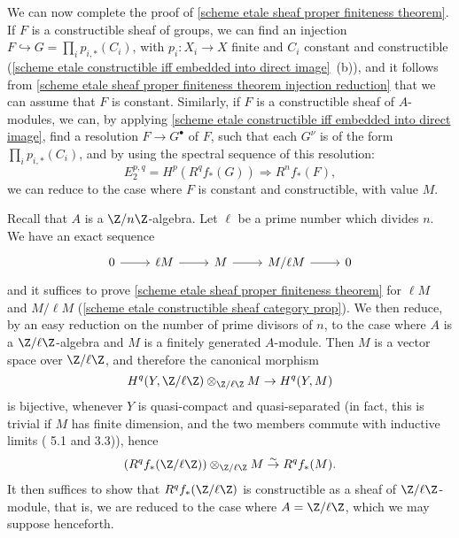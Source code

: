 We can now complete the proof of \cref{scheme etale sheaf proper finiteness theorem}. If $F$ is a constructible sheaf of groups, we can find an injection $F\hookrightarrow G=\prod_ip_{i,*}(C_i)$, with $p_i:X_i\to X$ finite and $C_i$ constant and constructible (\cref{scheme etale constructible iff embedded into direct image}~(b)), and it follows from \cref{scheme etale sheaf proper finiteness theorem injection reduction} that we can assume that $F$ is constant. Similarly, if $F$ is a constructible sheaf of $A$-modules, we can, by applying \cref{scheme etale constructible iff embedded into direct image}, find a resolution $F\to G^\bullet$ of $F$, such that each $G^\nu$ is of the form $\prod_ip_{i,*}(C_i)$, and by using the spectral sequence of this resolution:
\[E_2^{p,q}=H^p(R^qf_*(G))\Rightarrow R^nf_*(F),\]
we can reduce to the case where $F$ is constant and constructible, with value $M$.\par
Recall that $A$ is a $\Z/n\Z$-algebra. Let $\ell$ be a prime number which divides $n$. We have an exact sequence
\[\begin{tikzcd}
0\ar[r]&\ell M\ar[r]&M\ar[r]&M/\ell M\ar[r]&0
\end{tikzcd}\]
and it suffices to prove \cref{scheme etale sheaf proper finiteness theorem} for $\ell M$ and $M/\ell M$ (\cref{scheme etale constructible sheaf category prop}). We then reduce, by an easy reduction on the number of prime divisors of $n$, to the case where $A$ is a $\Z/\ell\Z$-algebra and $M$ is a finitely generated $A$-module. Then $M$ is a vector space over $\Z/\ell\Z$, and therefore the canonical morphism
\[H^q(Y,\Z/\ell\Z)\otimes_{\Z/\ell\Z}M\to H^q(Y,M)\]
is bijective, whenever $Y$ is quasi-compact and quasi-separated (in fact, this is trivial if $M$ has finite dimension, and the two members commute with inductive limits (\cite{SGA4-2}  5.1 and  3.3)), hence
\[(R^qf_*(\Z/\ell\Z))\otimes_{\Z/\ell\Z}M\stackrel{\sim}{\to} R^qf_*(M).\]
It then suffices to show that $R^qf_*(\Z/\ell\Z)$ is constructible as a sheaf of $\Z/\ell\Z$-module, that is, we are reduced to the case where $A=\Z/\ell\Z$, which we may suppose henceforth.\par
